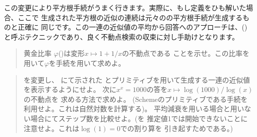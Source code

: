 この変更により平方根手続がうまく行きます。実際に、もし定義をひも解いた場合、ここで
生成された平方根の近似の連続は元々のの平方根手続が生成するものと正確に
同じです。この一連の近似値の平均から回答へのアプローチは、()
と呼ぶテクニックであり、良く不動点検索の収束に対し手助けとなります。

\begin{quote}
 黄金比率
\( \varphi \)()は変形\( x \mapsto 1 + 1 / x \)の不動点である
ことを示せ。この比率を用いて\( \varphi \)を手続を用いて求めよ。
\end{quote}

\begin{quote}
 を変更し、
にて示された
とプリミティブを用いて生成する一連の近似値を表示するようにせよ。
次に\( x^x = 1000 \)の答を\( x \mapsto \log(1000) / \log(x) \)の不動点を
求める方法で求めよ。
(Schemeのプリミティブである手続を利用せよ。これは自然対数を計算する)。
平均減衰を用いる場合と用いない場合にてステップ数を比較せよ。(を
推定値1では開始できないことに注意せよ。これは\( \log(1) = 0 \)での割り算を
引き起すためである。)
\end{quote}

